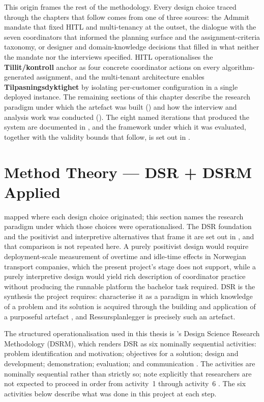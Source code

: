 This origin frames the rest of the methodology. Every design choice traced through the chapters that follow comes from one of three sources: the Admmit mandate that fixed HITL and multi-tenancy at the outset, the dialogue with the seven coordinators that informed the planning surface and the assignment-criteria taxonomy, or designer and domain-knowledge decisions that filled in what neither the mandate nor the interviews specified. HITL operationalises the \textbf{Tillit/kontroll} anchor as four concrete coordinator actions on every algorithm-generated assignment, and the multi-tenant architecture enables \textbf{Tilpasningsdyktighet} by isolating per-customer configuration in a single deployed instance. The remaining sections of this chapter describe the research paradigm under which the artefact was built () and how the interview and analysis work was conducted (). The eight named iterations that produced the system are documented in , and the framework under which it was evaluated, together with the validity bounds that follow, is set out in .


\section{Method Theory --- DSR + DSRM Applied}
\label{sec:dsr-dsrm}

 mapped where each design choice originated; this section names the research paradigm under which those choices were operationalised. The DSR foundation and the positivist and interpretive alternatives that frame it are set out in , and that comparison is not repeated here. A purely positivist design would require deployment-scale measurement of overtime and idle-time effects in Norwegian transport companies, which the present project's stage does not support, while a purely interpretive design would yield rich description of coordinator practice without producing the runnable platform the bachelor task required. DSR is the synthesis the project requires: \textcite{hevner2004design} characterise it as a paradigm in which knowledge of a problem and its solution is acquired through the building and application of a purposeful artefact \parencite[p.~82]{hevner2004design}, and Ressursplanlegger is precisely such an artefact.

The structured operationalisation used in this thesis is \textcite{peffers2007dsrm}'s Design Science Research Methodology (DSRM), which renders DSR as six nominally sequential activities: problem identification and motivation; objectives for a solution; design and development; demonstration; evaluation; and communication \parencite[p.~46]{peffers2007dsrm}. The activities are nominally sequential rather than strictly so; \textcite{peffers2007dsrm} note explicitly that researchers are not expected to proceed in order from activity~1 through activity~6 \parencite[p.~56]{peffers2007dsrm}. The six activities below describe what was done in this project at each step.

